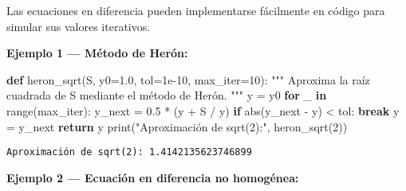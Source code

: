 \documentclass[
  letterpaper,
  DIV=11,
  numbers=noendperiod]{scrreprt}
\newenvironment{Shaded}{\begin{snugshade}}{\end{snugshade}}
\newcommand{\BuiltInTok}[1]{\textcolor[rgb]{0.00,0.23,0.31}{#1}}
\newcommand{\CommentTok}[1]{\textcolor[rgb]{0.37,0.37,0.37}{#1}}
\newcommand{\ControlFlowTok}[1]{\textcolor[rgb]{0.00,0.23,0.31}{\textbf{#1}}}
\newcommand{\DecValTok}[1]{\textcolor[rgb]{0.68,0.00,0.00}{#1}}
\newcommand{\FloatTok}[1]{\textcolor[rgb]{0.68,0.00,0.00}{#1}}
\newcommand{\KeywordTok}[1]{\textcolor[rgb]{0.00,0.23,0.31}{\textbf{#1}}}
\newcommand{\NormalTok}[1]{\textcolor[rgb]{0.00,0.23,0.31}{#1}}
\newcommand{\OperatorTok}[1]{\textcolor[rgb]{0.37,0.37,0.37}{#1}}
\newcommand{\StringTok}[1]{\textcolor[rgb]{0.13,0.47,0.30}{#1}}
\begin{document}
Las ecuaciones en diferencia pueden implementarse fácilmente en código
para simular sus valores iterativos.

\textbf{Ejemplo 1 --- Método de Herón:}

\begin{Shaded}
\begin{Highlighting}[]
\KeywordTok{def}\NormalTok{ heron\_sqrt(S, y0}\OperatorTok{=}\FloatTok{1.0}\NormalTok{, tol}\OperatorTok{=}\FloatTok{1e{-}10}\NormalTok{, max\_iter}\OperatorTok{=}\DecValTok{10}\NormalTok{):}
    \CommentTok{"""}
\CommentTok{    Aproxima la raíz cuadrada de S mediante el método de Herón.}
\CommentTok{    """}
\NormalTok{    y }\OperatorTok{=}\NormalTok{ y0}
    \ControlFlowTok{for}\NormalTok{ \_ }\KeywordTok{in} \BuiltInTok{range}\NormalTok{(max\_iter):}
\NormalTok{        y\_next }\OperatorTok{=} \FloatTok{0.5} \OperatorTok{*}\NormalTok{ (y }\OperatorTok{+}\NormalTok{ S }\OperatorTok{/}\NormalTok{ y)}
        \ControlFlowTok{if} \BuiltInTok{abs}\NormalTok{(y\_next }\OperatorTok{{-}}\NormalTok{ y) }\OperatorTok{\textless{}}\NormalTok{ tol:}
            \ControlFlowTok{break}
\NormalTok{        y }\OperatorTok{=}\NormalTok{ y\_next}
    \ControlFlowTok{return}\NormalTok{ y}
\BuiltInTok{print}\NormalTok{(}\StringTok{"Aproximación de sqrt(2):"}\NormalTok{, heron\_sqrt(}\DecValTok{2}\NormalTok{))}
\end{Highlighting}
\end{Shaded}

\begin{verbatim}
Aproximación de sqrt(2): 1.4142135623746899
\end{verbatim}

\textbf{Ejemplo 2 --- Ecuación en diferencia no homogénea:}
\end{document}

